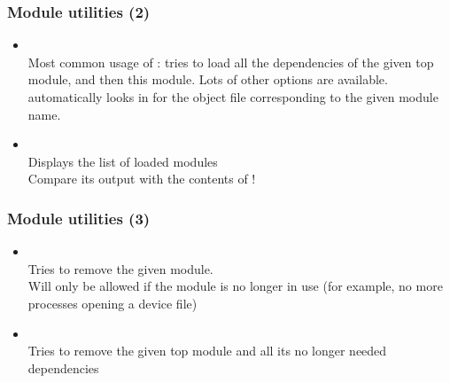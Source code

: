\begin{frame}
  \frametitle{Module utilities (2)}
  \begin{itemize}
  \item {}\\
    Most common usage of : tries to load all the
    dependencies of the given top module, and then this module. Lots of
    other options are available.  automatically looks in
     for the object file corresponding
    to the given module name.
  \item {}\\
    Displays the list of loaded modules\\
    Compare its output with the contents of !
  \end{itemize}
\end{frame}

\begin{frame}
  \frametitle{Module utilities (3)}
  \begin{itemize}
  \item {}\\
    Tries to remove the given module.\\
    Will only be allowed if the module is no longer in use (for
    example, no more processes opening a device file)
  \item {}\\
    Tries to remove the given top module and all its no longer needed dependencies
  \end{itemize}
\end{frame}

